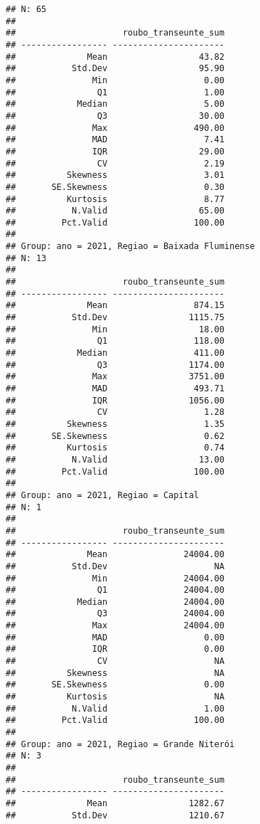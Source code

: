 \documentclass[
]{article}
\begin{document}
\begin{verbatim}
## N: 65  
## 
##                     roubo_transeunte_sum
## ----------------- ----------------------
##              Mean                  43.82
##           Std.Dev                  95.90
##               Min                   0.00
##                Q1                   1.00
##            Median                   5.00
##                Q3                  30.00
##               Max                 490.00
##               MAD                   7.41
##               IQR                  29.00
##                CV                   2.19
##          Skewness                   3.01
##       SE.Skewness                   0.30
##          Kurtosis                   8.77
##           N.Valid                  65.00
##         Pct.Valid                 100.00
## 
## Group: ano = 2021, Regiao = Baixada Fluminense  
## N: 13  
## 
##                     roubo_transeunte_sum
## ----------------- ----------------------
##              Mean                 874.15
##           Std.Dev                1115.75
##               Min                  18.00
##                Q1                 118.00
##            Median                 411.00
##                Q3                1174.00
##               Max                3751.00
##               MAD                 493.71
##               IQR                1056.00
##                CV                   1.28
##          Skewness                   1.35
##       SE.Skewness                   0.62
##          Kurtosis                   0.74
##           N.Valid                  13.00
##         Pct.Valid                 100.00
## 
## Group: ano = 2021, Regiao = Capital  
## N: 1  
## 
##                     roubo_transeunte_sum
## ----------------- ----------------------
##              Mean               24004.00
##           Std.Dev                     NA
##               Min               24004.00
##                Q1               24004.00
##            Median               24004.00
##                Q3               24004.00
##               Max               24004.00
##               MAD                   0.00
##               IQR                   0.00
##                CV                     NA
##          Skewness                     NA
##       SE.Skewness                   0.00
##          Kurtosis                     NA
##           N.Valid                   1.00
##         Pct.Valid                 100.00
## 
## Group: ano = 2021, Regiao = Grande Niterói  
## N: 3  
## 
##                     roubo_transeunte_sum
## ----------------- ----------------------
##              Mean                1282.67
##           Std.Dev                1210.67

\end{verbatim}
\end{document}
